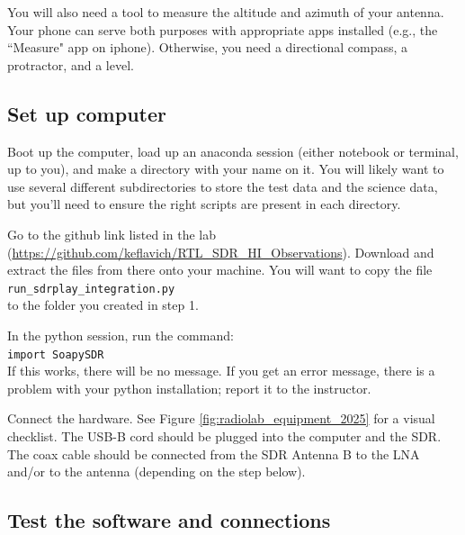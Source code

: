 \documentclass[11pt]{article}
\begin{document}
You will also need a tool to measure the altitude and azimuth of your antenna.
Your phone can serve both purposes with appropriate apps installed (e.g., the ``Measure" app on iphone).
Otherwise, you need a directional compass, a protractor, and a level.



\subsection{Set up computer}
\label{sec:computer}
Boot up the computer, load up an anaconda session (either notebook or terminal,
up to you), and make a directory with your name on it.  You will likely want to
use several different subdirectories to store the test data and the science
data, but you'll need to ensure the right scripts are present in each
directory.

Go to the github link listed in the lab
(\url{https://github.com/keflavich/RTL_SDR_HI_Observations}). Download and
extract the files from there onto your machine. You will want to copy the file\\
\verb|run_sdrplay_integration.py|  \\
to the
folder you created in step 1.

In the python session, run the command: \\
\verb|import SoapySDR|\\
If this works, there will be no message.  If you get an error message, there is
a problem with your python installation; report it to the instructor.


Connect the hardware.
See Figure \ref{fig:radiolab_equipment_2025} for a visual checklist.
The USB-B cord should be plugged into the computer and the SDR.
The coax cable should be connected from the SDR Antenna B to the LNA and/or to the antenna (depending on the step below).






\subsection{Test the software and connections}
\end{document}
